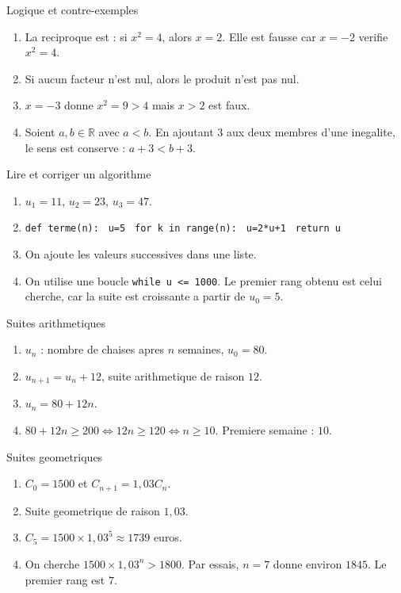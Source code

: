 \documentclass[11pt,a4paper]{article}
\newcounter{corrige}
\newcommand{\R}{\mathbb{R}}
\begin{document}
\begin{corrbox}{Logique et contre-exemples}
\begin{enumerate}
  \item La reciproque est : si $x^2=4$, alors $x=2$. Elle est fausse car $x=-2$ verifie $x^2=4$.
  \item Si aucun facteur n'est nul, alors le produit n'est pas nul.
  \item $x=-3$ donne $x^2=9>4$ mais $x>2$ est faux.
  \item Soient $a,b\in\R$ avec $a<b$. En ajoutant $3$ aux deux membres d'une inegalite, le sens est conserve : $a+3<b+3$.
\end{enumerate}
\end{corrbox}

\begin{corrbox}{Lire et corriger un algorithme}
\begin{enumerate}
  \item $u_1=11$, $u_2=23$, $u_3=47$.
  \item \texttt{def terme(n):}\newline
\texttt{    u=5}\newline
\texttt{    for k in range(n):}\newline
\texttt{        u=2*u+1}\newline
\texttt{    return u}
  \item On ajoute les valeurs successives dans une liste.
  \item On utilise une boucle \texttt{while u <= 1000}. Le premier rang obtenu est celui cherche, car la suite est croissante a partir de $u_0=5$.
\end{enumerate}
\end{corrbox}

\begin{corrbox}{Suites arithmetiques}
\begin{enumerate}
  \item $u_n$ : nombre de chaises apres $n$ semaines, $u_0=80$.
  \item $u_{n+1}=u_n+12$, suite arithmetique de raison $12$.
  \item $u_n=80+12n$.
  \item $80+12n\ge200 \Longleftrightarrow 12n\ge120 \Longleftrightarrow n\ge10$. Premiere semaine : $10$.
\end{enumerate}
\end{corrbox}

\begin{corrbox}{Suites geometriques}
\begin{enumerate}
  \item $C_0=1500$ et $C_{n+1}=1,03C_n$.
  \item Suite geometrique de raison $1,03$.
  \item $C_5=1500\times1,03^5\approx1739$ euros.
  \item On cherche $1500\times1,03^n>1800$. Par essais, $n=7$ donne environ $1845$. Le premier rang est $7$.
\end{enumerate}
\end{corrbox}
\end{document}
